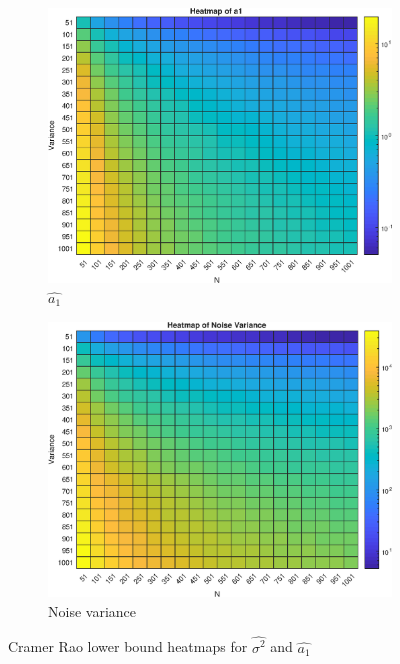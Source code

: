 \begin{figure}[h!]
\centering
\begin{subfigure}{0.33\textwidth}
\centering
\includegraphics[width = \textwidth]{heatmap_a1}
\caption{$\hat{a_1}$}
\label{fig:heatmap_a1}
\end{subfigure}
\begin{subfigure}{0.33\textwidth}
\centering
\includegraphics[width = \textwidth]{heatmap_noise}
\caption{Noise variance}
\label{fig:heatmap_noise}
\end{subfigure}
\caption{Cramer Rao lower bound heatmaps for $\hat{\sigma^2}$ and $\hat{a_1}$}
\label{fig:heatmap}
\end{figure}

